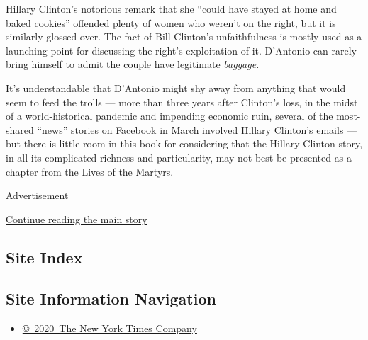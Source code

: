 Hillary Clinton's notorious remark that she ``could have stayed at home
and baked cookies'' offended plenty of women who weren't on the right,
but it is similarly glossed over. The fact of Bill Clinton's
unfaithfulness is mostly used as a launching point for discussing the
right's exploitation of it. D'Antonio can rarely bring himself to admit
the couple have legitimate \emph{baggage.}

It's understandable that D'Antonio might shy away from anything that
would seem to feed the trolls --- more than three years after Clinton's
loss, in the midst of a world-historical pandemic and impending economic
ruin, several of the most-shared ``news'' stories on Facebook in March
involved Hillary Clinton's emails --- but there is little room in this
book for considering that the Hillary Clinton story, in all its
complicated richness and particularity, may not best be presented as a
chapter from the Lives of the Martyrs.

Advertisement

\protect\hyperlink{after-bottom}{Continue reading the main story}

\hypertarget{site-index}{%
\subsection{Site Index}\label{site-index}}

\hypertarget{site-information-navigation}{%
\subsection{Site Information
Navigation}\label{site-information-navigation}}

\begin{itemize}
\tightlist
\item
  \href{https://help.nytimes.com/hc/en-us/articles/115014792127-Copyright-notice}{©~2020~The
  New York Times Company}
\end{itemize}


